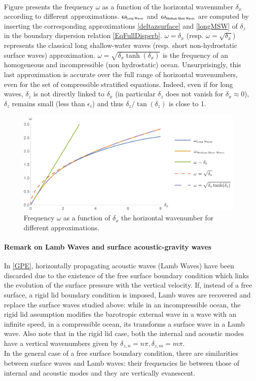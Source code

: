 \\
%
%
Figure  presents the frequency $\omega$ as a function of the horizontal wavenumber $\delta_x$ according to different approximations. $\omega_{\mbox{\tiny Long Waves}}$ and $\omega_{\mbox{\tiny Medium Short Waves}}$ are computed by inserting the corresponding approximations \ref{deltazsurface} and \ref{longMSW} of $\delta_z$ in the boundary dispersion relation \ref{EqFullDisperb}. $\omega=\delta_x$ (resp. $\omega=\sqrt{\delta_x}$) represents the classical long shallow-water waves (resp. short non-hydrostatic surface waves) approximation. $\omega=\sqrt{\delta_x \tanh(\delta_x)}$ is the frequency of an homogeneous and incompressible (non hydrostatic) ocean. Unsurprisingly, this last approximation is accurate over the full range of horizontal wavenumbers, even for the set of compressible stratified equations. Indeed, even if for long waves, $\delta_z$ is not directly linked to $\delta_x$ (in particular $\delta_z$ does not vanish for $\delta_x \approx 0$), $\delta_z$ remains small (less than $\epsilon_i$) and thus $\delta_z/\tan(\delta_z)$ is close to 1.
\begin{figure}[h]
	\centerline{
		\includegraphics[width=0.9\linewidth]{FIGURES/omegadx.png}
	}
	\caption{Frequency $\omega$ as a function of $\delta_x$ the horizontal wavenumber for different approximations.}
	\label{omegadx}
\end{figure}
\paragraph{Remark on Lamb Waves and surface acoustic-gravity waves}
In \ref{GPE}, horizontally propagating acoustic waves (Lamb Waves) have been discarded due to the existence of the free surface boundary condition which links the evolution of the surface pressure with the vertical velocity. If, instead of a free surface, a rigid lid boundary condition is imposed, Lamb waves are recovered and replace the surface waves studied above: while in an incompressible ocean, the rigid lid assumption modifies the barotropic external wave in a wave with an infinite speed, in a compressible ocean, its transforms a surface wave in a Lamb wave.  Also note that in the rigid lid case, both the internal and acoustic modes have a vertical wavenumbers given by $\delta_{z,n} = n\pi, \delta_{z,m} = m\pi$.\\
In the general case of a free surface boundary condition, there are similarities between surface waves and Lamb waves: their frequencies lie between those of internal and acoustic modes and they are vertically evanescent.

